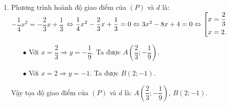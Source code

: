 \begin{ex}
{\begin{enumerate}[1.]
\begin{enumerate}
\begin{center}
        		\end{center}
        	\end{enumerate}
         \item Phương trình hoành độ giao điểm của $(P)$ và $d$ là:\\ $-\dfrac{1}{4}x^2=-\dfrac{2}{3}x+\dfrac{1}{3}$
         $\Leftrightarrow \dfrac{1}{4}x^2-\dfrac{2}{3}x+\dfrac{1}{3}=0 \Leftrightarrow 3x^2-8x+4=0 \Leftrightarrow \left[\begin{aligned}&x=\dfrac{2}{3}\\&x=2.\end{aligned}\right.$
         \begin{enumerate}
         	\item[$\bullet$] Với $x=\dfrac{2}{3} \Rightarrow y=-\dfrac{1}{9}$. Ta được $A\left(\dfrac{2}{3};-\dfrac{1}{9} \right) $.
         	\item[$\bullet$] Với $x=2 \Rightarrow y=-1$. Ta được $B\left(2;-1 \right)$.
         \end{enumerate}
     Vậy tọa độ giao điểm của $(P)$ và $d$ là: $A\left(\dfrac{2}{3};-\dfrac{1}{9} \right) $, $B\left(2;-1 \right)$.
    \end{enumerate}
    }
\end{ex}

